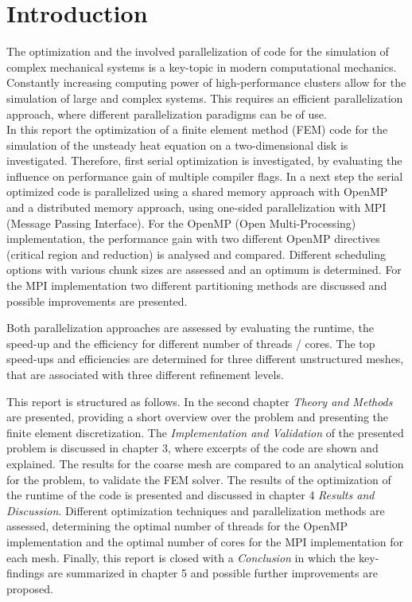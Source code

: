 \section{Introduction}

The optimization and the involved parallelization of code for the simulation of complex mechanical systems is a key-topic in modern computational mechanics. Constantly increasing computing power of high-performance clusters allow for the simulation of large and complex systems. This requires an efficient parallelization approach, where different parallelization paradigms can be of use. \\

In this report the optimization of a finite element method (FEM) code for the simulation of the unsteady heat equation on a two-dimensional disk is investigated. Therefore, first serial optimization is investigated, by evaluating the influence on performance gain of multiple compiler flags. In a next step the serial optimized code is parallelized using a shared memory approach with OpenMP and a distributed memory approach, using one-sided parallelization with MPI (Message Passing Interface). For the OpenMP (Open Multi-Processing) implementation, the performance gain with two different OpenMP directives (critical region and reduction) is analysed and compared. Different scheduling options with various chunk sizes are assessed and an optimum is determined. For the MPI implementation two different partitioning methods are discussed and possible improvements are presented.

 Both parallelization approaches are assessed by evaluating the runtime, the speed-up and the efficiency for different number of threads / cores. The top speed-ups and efficiencies are determined for three different unstructured meshes, that are associated with three different refinement levels.  

 This report is structured as follows. In the second chapter \textit{Theory and Methods} are presented, providing a short overview over the problem and presenting the finite element discretization. The \textit{Implementation and Validation} of the presented problem is discussed in chapter 3, where excerpts of the code are shown and explained. The results for the coarse mesh are compared to an analytical solution for the problem, to validate the FEM solver. The results of the optimization of the runtime of the code is presented and discussed in chapter 4 \textit{Results and Discussion}. Different optimization techniques and parallelization methods are assessed, determining the optimal number of threads for the OpenMP implementation and the optimal number of cores for the MPI implementation for each mesh.  Finally, this report is closed with a \textit{Conclusion} in which the key-findings are summarized in chapter 5 and possible further improvements are proposed.
